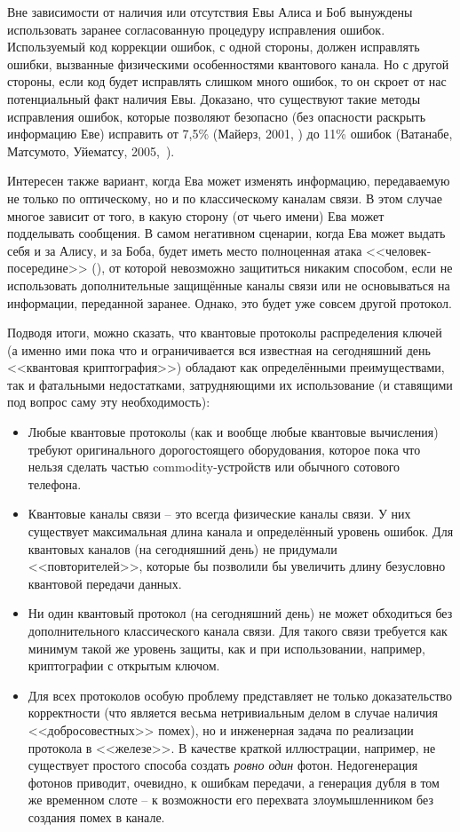 Вне зависимости от наличия или отсутствия Евы Алиса и Боб вынуждены использовать заранее согласованную процедуру исправления ошибок. Используемый код коррекции ошибок, с одной стороны, должен исправлять ошибки, вызванные физическими особенностями квантового канала. Но с другой стороны, если код будет исправлять слишком много ошибок, то он скроет от нас потенциальный факт наличия Евы. Доказано, что существуют такие методы исправления ошибок, которые позволяют безопасно (без опасности раскрыть информацию Еве) исправить от 7,5\% (Майерз, 2001, \cite{Mayers:2001}) до 11\% ошибок (Ватанабе, Матсумото, Уйематсу, 2005,~\cite{Watanabe:Matsumoto:Uyematsu:2005}).

Интересен также вариант, когда Ева может изменять информацию, передаваемую не только по оптическому, но и по классическому каналам связи. В этом случае многое зависит от того, в какую сторону (от чьего имени) Ева может подделывать сообщения. В самом негативном сценарии, когда Ева может выдать себя и за Алису, и за Боба, будет иметь место полноценная атака <<человек-посередине>> (), от которой невозможно защититься никаким способом, если не использовать дополнительные защищённые каналы связи или не основываться на информации, переданной заранее. Однако, это будет уже совсем другой протокол.

Подводя итоги, можно сказать, что квантовые протоколы распределения ключей (а именно ими пока что и ограничивается вся известная на сегодняшний день <<квантовая криптография>>) обладают как определёнными преимуществами, так и фатальными недостатками, затрудняющими их использование (и ставящими под вопрос саму эту необходимость):

\begin{itemize}
	\item Любые квантовые протоколы (как и вообще любые квантовые вычисления) требуют оригинального дорогостоящего оборудования, которое пока что нельзя сделать частью commodity-устройств или обычного сотового телефона.
	\item Квантовые каналы связи -- это всегда физические каналы связи. У них существует максимальная длина канала и определённый уровень ошибок. Для квантовых каналов (на сегодняшний день) не придумали <<повторителей>>, которые бы позволили бы увеличить длину безусловно квантовой передачи данных.
	\item Ни один квантовый протокол (на сегодняшний день) не может обходиться без дополнительного классического канала связи. Для такого связи требуется как минимум такой же уровень защиты, как и при использовании, например, криптографии с открытым ключом.
	\item Для всех протоколов особую проблему представляет не только доказательство корректности (что является весьма нетривиальным делом в случае наличия <<добросовестных>> помех), но и инженерная задача по реализации протокола в <<железе>>. В качестве краткой иллюстрации, например, не существует простого способа создать \emph{ровно один} фотон. Недогенерация фотонов приводит, очевидно, к ошибкам передачи, а генерация дубля в том же временном слоте -- к возможности его перехвата злоумышленником без создания помех в канале.
\end{itemize}


